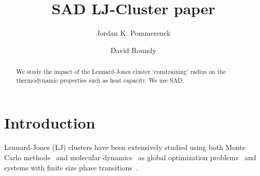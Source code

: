 \documentclass[letterpaper,twocolumn,amsmath,amssymb,pre,aps,10pt]{revtex4-1}
\begin{document}
\title{SAD LJ-Cluster paper
}

\author{Jordan K. Pommerenck} \author{David Roundy}

\begin{abstract}
  We study the impact of the Lennard-Jones cluster `constraining' radius on 
  the thermodynamic properties such as heat capacity. We use SAD.
\end{abstract}

\maketitle

\section{Introduction}


Lennard-Jones (LJ) clusters have been extensively studied using both Monte Carlo methods~\cite{frantsuzov2005size, mandelshtam2006structural,
mandelshtam2006multiple} and molecular dynamics~\cite{honeycutt1987molecular, calvo1995configurational, calvo2000phase} as global optimization
problems~\cite{wales1997global, wales1998global, wales1999global, doye1999double} and systems with finite size phase
transitions~\cite{neirotti2000phase, sabo2005pressure, sehgal2014phase}.
\end{document}

